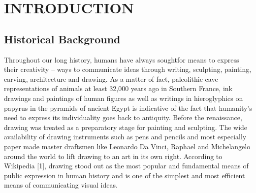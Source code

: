 \chapter{INTRODUCTION} %

\section{Historical Background}
Throughout our long history, humans have always soughtfor means 
to express their creativity – ways to communicate ideas through writing, 
sculpting, painting, carving, architecture and drawing. As a matter of fact,
paleolithic cave representations of animals at least 32,000 years ago in  
Southern France, ink drawings and paintings of human figures as well as writings 
in hieroglyphics on papyrus in the pyramids of ancient Egypt is
indicative of the fact that humanity's need to express its individuality goes back to
antiquity. Before the renaissance, drawing was treated as a preparatory stage
for painting and sculpting. The wide availability of drawing instruments such as 
pens and pencils and most especially paper made master draftsmen like
Leonardo Da Vinci, Raphael and Michelangelo around the world to lift drawing
to an art in its own right. According to Wikipedia [1], drawing stood out
 as the most popular and fundamental means of public expression in human history
 and is one of the simplest and most efficient means of communicating visual ideas.\\

